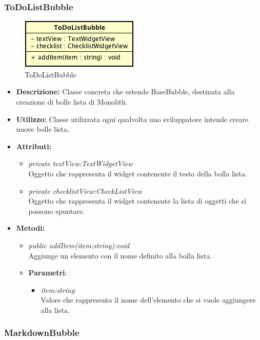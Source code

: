 \subsubsection{ToDoListBubble}

\label{ToDoListBubble}
\begin{figure}[ht]
	\centering
	\includegraphics[scale=0.5]{Sezioni/SottosezioniST/img/ToDoListBubble.png}
	\caption{ToDoListBubble}
\end{figure}

\begin{itemize}
\item \textbf{Descrizione:} Classe concreta che estende BaseBubble, destinata alla creazione di bolle lista di Monolith.
\item \textbf{Utilizzo:} Classe utilizzata ogni qualvolta uno sviluppatore intende creare nuove bolle lista.
\item \textbf{Attributi:}
\begin{itemize}
\item \textit{private textView:TextWidgetView}\\
Oggetto che rappresenta il widget contenente il testo della bolla lista.
\item \textit{private checklistView:CheckListView}\\
Oggetto che rappresenta il widget contenente la lista di oggetti che si possono spuntare.
\end{itemize}
\item \textbf{Metodi:}
\begin{itemize}
\item \textit{public addItem(item:string):void}\\
Aggiunge un elemento con il nome definito alla bolla lista.
\item{\textbf{Parametri}: \begin{itemize}
\item \textit{item:string}\\
Valore che rappresenta il nome dell'elemento che si vuole aggiungere alla lista.
\end{itemize}}
\end{itemize}
\end{itemize}

\subsubsection{MarkdownBubble}

